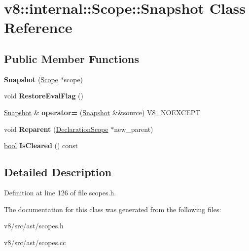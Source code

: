\hypertarget{classv8_1_1internal_1_1Scope_1_1Snapshot}{}\section{v8\+:\+:internal\+:\+:Scope\+:\+:Snapshot Class Reference}
\label{classv8_1_1internal_1_1Scope_1_1Snapshot}
\subsection*{Public Member Functions}
\begin{DoxyCompactItemize}
\item 
\mbox{\label{classv8_1_1internal_1_1Scope_1_1Snapshot_aa5f4e69aaebd85ca4c11a8da9ce0e409}} 
{\bfseries Snapshot} (\mbox{\hyperlink{classv8_1_1internal_1_1Scope}{Scope}} $\ast$scope)
\item 
\mbox{\label{classv8_1_1internal_1_1Scope_1_1Snapshot_af2f931b4f68d6e7eafe92bc14d22840b}} 
void {\bfseries Restore\+Eval\+Flag} ()
\item 
\mbox{\label{classv8_1_1internal_1_1Scope_1_1Snapshot_ac6610f5b7208e29ca40bf2c39bfb9422}} 
\mbox{\hyperlink{classv8_1_1internal_1_1Scope_1_1Snapshot}{Snapshot}} \& {\bfseries operator=} (\mbox{\hyperlink{classv8_1_1internal_1_1Scope_1_1Snapshot}{Snapshot}} \&\&source) V8\+\_\+\+N\+O\+E\+X\+C\+E\+PT
\item 
\mbox{\label{classv8_1_1internal_1_1Scope_1_1Snapshot_adb4941ff2e16d5d629aa7750fac5ac54}} 
void {\bfseries Reparent} (\mbox{\hyperlink{classv8_1_1internal_1_1DeclarationScope}{Declaration\+Scope}} $\ast$new\+\_\+parent)
\item 
\mbox{\label{classv8_1_1internal_1_1Scope_1_1Snapshot_a1a286787df2c4b9c60e0942af7f586a6}} 
\mbox{\hyperlink{classbool}{bool}} {\bfseries Is\+Cleared} () const
\end{DoxyCompactItemize}


\subsection{Detailed Description}


Definition at line 126 of file scopes.\+h.



The documentation for this class was generated from the following files\+:\begin{DoxyCompactItemize}
\item 
v8/src/ast/scopes.\+h\item 
v8/src/ast/scopes.\+cc\end{DoxyCompactItemize}
